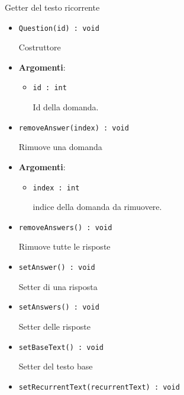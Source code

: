 \documentclass[../DefinizioneDiProdotto.tex]{subfiles}
\begin{document}
\begin{itemize}
\begin{itemize}
\begin{itemize}
	 Getter del testo ricorrente
	\end{itemize}\vspace{0.5em}
	\begin{itemize}
	\item \texttt{Question(id) : void}\

	 Costruttore

	\item \textbf{Argomenti}:
	\begin{itemize}
	\item \texttt{id : int}\

	 Id della domanda.
	\end{itemize}
	\end{itemize}\vspace{0.5em}
	\begin{itemize}
	\item \texttt{removeAnswer(index) : void}\

	 Rimuove una domanda

	\item \textbf{Argomenti}:
	\begin{itemize}
	\item \texttt{index : int}\

	 indice della domanda da rimuovere.
	\end{itemize}
	\end{itemize}\vspace{0.5em}
	\begin{itemize}
	\item \texttt{removeAnswers() : void}\

	 Rimuove tutte le risposte
	\end{itemize}\vspace{0.5em}
	\begin{itemize}
	\item \texttt{setAnswer() : void}\

	 Setter di una risposta
	\end{itemize}\vspace{0.5em}
	\begin{itemize}
	\item \texttt{setAnswers() : void}\

	 Setter delle risposte
	\end{itemize}\vspace{0.5em}
	\begin{itemize}
	\item \texttt{setBaseText() : void}\

	 Setter del testo base
	\end{itemize}\vspace{0.5em}
	\begin{itemize}
	\item \texttt{setRecurrentText(recurrentText) : void}\


\end{itemize}
\end{itemize}
\end{itemize}
\end{document}

